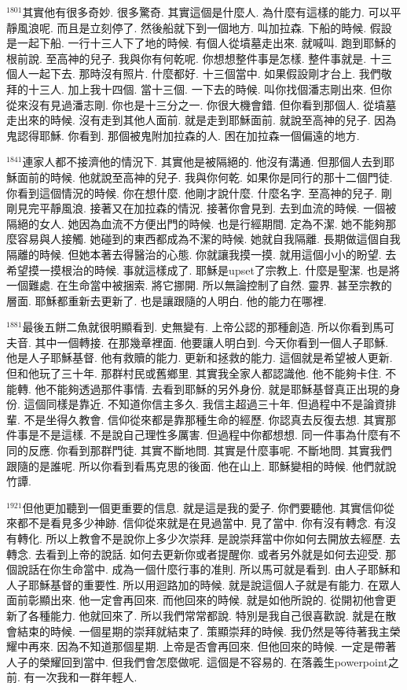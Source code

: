 \documentclass{book}
\begin{document}
$^{1801}$其實他有很多奇妙.
很多驚奇.
其實這個是什麼人.
為什麼有這樣的能力.
可以平靜風浪呢.
而且是立刻停了.
然後船就下到一個地方.
叫加拉森.
下船的時候.
假設是一起下船.
一行十三人下了地的時候.
有個人從墳墓走出來.
就喊叫.
跑到耶穌的根前說.
至高神的兒子.
我與你有何乾呢.
你想想整件事是怎樣.
整件事就是.
十三個人一起下去.
那時沒有照片.
什麼都好.
十三個當中.
如果假設剛才台上.
我們敬拜的十三人.
加上我十四個.
當十三個.
一下去的時候.
叫你找個潘志剛出來.
但你從來沒有見過潘志剛.
你也是十三分之一.
你很大機會錯.
但你看到那個人.
從墳墓走出來的時候.
沒有走到其他人面前.
就是走到耶穌面前.
就說至高神的兒子.
因為鬼認得耶穌.
你看到.
那個被鬼附加拉森的人.
困在加拉森一個偏遠的地方.

$^{1841}$連家人都不接濟他的情況下.
其實他是被隔絕的.
他沒有溝通.
但那個人去到耶穌面前的時候.
他就說至高神的兒子.
我與你何乾.
如果你是同行的那十二個門徒.
你看到這個情況的時候.
你在想什麼.
他剛才說什麼.
什麼名字.
至高神的兒子.
剛剛見完平靜風浪.
接著又在加拉森的情況.
接著你會見到.
去到血流的時候.
一個被隔絕的女人.
她因為血流不方便出門的時候.
也是行經期間.
定為不潔.
她不能夠那麼容易與人接觸.
她碰到的東西都成為不潔的時候.
她就自我隔離.
長期做這個自我隔離的時候.
但她本著去得醫治的心態.
你就讓我摸一摸.
就用這個小小的盼望.
去希望摸一摸根治的時候.
事就這樣成了.
耶穌是upset了宗教上.
什麼是聖潔.
也是將一個難處.
在生命當中被捆索.
將它挪開.
所以無論控制了自然.
靈界.
甚至宗教的層面.
耶穌都重新去更新了.
也是讓跟隨的人明白.
他的能力在哪裡.

$^{1881}$最後五餅二魚就很明顯看到.
史無變有.
上帝公認的那種創造.
所以你看到馬可夫音.
其中一個轉接.
在那幾章裡面.
他要讓人明白到.
今天你看到一個人子耶穌.
他是人子耶穌基督.
他有救贖的能力.
更新和拯救的能力.
這個就是希望被人更新.
但和他玩了三十年.
那群村民或舊鄉里.
其實我全家人都認識他.
他不能夠卡住.
不能轉.
他不能夠透過那件事情.
去看到耶穌的另外身份.
就是耶穌基督真正出現的身份.
這個同樣是靠近.
不知道你信主多久.
我信主超過三十年.
但過程中不是論資排輩.
不是坐得久教會.
信仰從來都是靠那種生命的經歷.
你認真去反復去想.
其實那件事是不是這樣.
不是說自己理性多厲害.
但過程中你都想想.
同一件事為什麼有不同的反應.
你看到那群門徒.
其實不斷地問.
其實是什麼事呢.
不斷地問.
其實我們跟隨的是誰呢.
所以你看到看馬克思的後面.
他在山上.
耶穌變相的時候.
他們就說竹譚.

$^{1921}$但他更加聽到一個更重要的信息.
就是這是我的愛子.
你們要聽他.
其實信仰從來都不是看見多少神跡.
信仰從來就是在見過當中.
見了當中.
你有沒有轉念.
有沒有轉化.
所以上教會不是說你上多少次崇拜.
是說崇拜當中你如何去開放去經歷.
去轉念.
去看到上帝的說話.
如何去更新你或者提醒你.
或者另外就是如何去迎受.
那個說話在你生命當中.
成為一個什麼行事的准則.
所以馬可就是看到.
由人子耶穌和人子耶穌基督的重要性.
所以用迴路加的時候.
就是說這個人子就是有能力.
在眾人面前彰顯出來.
他一定會再回來.
而他回來的時候.
就是如他所說的.
從開初他會更新了各種能力.
他就回來了.
所以我們常常都說.
特別是我自己很喜歡說.
就是在散會結束的時候.
一個星期的崇拜就結束了.
策顯崇拜的時候.
我仍然是等待著我主榮耀中再來.
因為不知道那個星期.
上帝是否會再回來.
但他回來的時候.
一定是帶著人子的榮耀回到當中.
但我們會怎麼做呢.
這個是不容易的.
在落義生powerpoint之前.
有一次我和一群年輕人.
\end{document}
